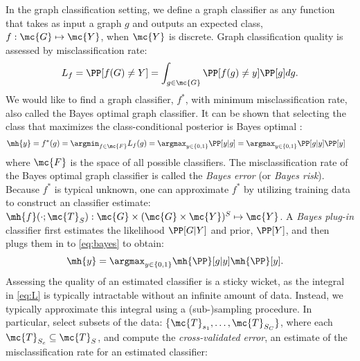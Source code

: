 In the graph classification setting, we define a graph classifier as any function that takes as input a graph $g$ and outputs an expected class, $f: \mc{G} \mapsto \mc{Y}$, when $\mc{Y}$ is discrete.  Graph classification quality is assessed by misclassification rate:
\begin{align} \label{eq:L}
	L_f = \PP[f(G) \neq Y] = \int_{g \in \mc{G}} \PP[f(g) \neq y]  \PP[g] dg.
\end{align}
We would like to find a graph classifier, $f^*$, with minimum misclassification rate, also called the Bayes optimal graph classifier. 
It can be shown that selecting the class that maximizes the class-conditional posterior is Bayes optimal \cite{DGL96}:
\begin{align} \label{eq:bayes}
	\mh{y} &= f^*(g) =\argmin_{f \in \mc{F}} L_f(g) = \argmax_{y \in \{0,1\}} \PP[y | g] 
	= \argmax_{y \in \{0,1\}} \PP[g | y] \PP[y]  
\end{align}
where $\mc{F}$ is the space of all possible classifiers. The misclassification rate of the Bayes optimal graph classifier is called the \emph{Bayes error} (or \emph{Bayes risk}).  Because $f^*$ is typical unknown, one can approximate $f^*$ by utilizing training data
to construct an classifier estimate: $\mh{f}(\cdot; \mc{T}_S): \mc{G} \times (\mc{G} \times \mc{Y})^S \mapsto \mc{Y}$.  
A \emph{Bayes plug-in} classifier first estimates the likelihood $\PP[G|Y]$ and prior, $\PP[Y]$, and then plugs them in to \eqref{eq:bayes} to obtain:
\begin{align} \label{eq:plugin}
	\mh{y} &= \argmax_{y \in \{0,1\}} \mh{\PP}[g | y] \mh{\PP}[y].  
\end{align}
Assessing the quality of an estimated classifier is a sticky wicket, as the integral in \eqref{eq:L} is typically intractable without an infinite amount of data.  Instead, we typically approximate this integral using a (sub-)sampling procedure.  In particular, select subsets of the data: \{$\mc{T}_{s_1},\ldots, \mc{T}_{S_C}\}$, where each $\mc{T}_{S_c} \subseteq \mc{T}_S$, and compute the \emph{cross-validated error}, an estimate of the misclassification rate for an estimated classifier:

